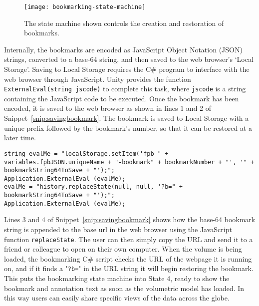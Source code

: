 \begin{figure}[htbp!]
\centering
\texttt{[image: bookmarking-state-machine]}
\caption[FPBioimage: Bookmark creation and restoration is controlled by a state machine]{The state machine shown controls the creation and restoration of bookmarks. }
\label{fig:bookmarking-state-machine}
\end{figure}

Internally, the bookmarks are encoded as JavaScript Object Notation (JSON) strings, converted to a base-64 string, and then saved to the web browser's `Local Storage'.
Saving to Local Storage requires the C\# program to interface with the web browser through JavaScript.
Unity provides the function \texttt{ExternalEval(string jscode)} to complete this task, where \texttt{jscode} is a string containing the JavaScript code to be executed.
Once the bookmark has been encoded, it is saved to the web browser as shown in lines 1 and 2 of Snippet~\ref{snip:savingbookmark}.
The bookmark is saved to Local Storage with a unique prefix followed by the bookmark's number, so that it can be restored at a later time.

\begin{lstfloat}
\begin{lstlisting}[language={[Sharp]c}, label={snip:savingbookmark}, caption={C\#-JavaScript interface code for interacting with the browser's local storage to save and share bookmarks}]
string evalMe = "localStorage.setItem('fpb-" + variables.fpbJSON.uniqueName + "-bookmark" + bookmarkNumber + "', '" + bookmarkString64ToSave + "');";
Application.ExternalEval (evalMe);
evalMe = "history.replaceState(null, null, '?b=" + bookmarkString64ToSave + "');";
Application.ExternalEval (evalMe);
\end{lstlisting}
\end{lstfloat}

Lines 3 and 4 of Snippet~\ref{snip:savingbookmark} shows how the base-64 bookmark string is appended to the base url in the web browser using the JavaScript function \texttt{replaceState}.
The user can then simply copy the URL and send it to a friend or colleague to open on their own computer.
When the volume is being loaded, the bookmarking C\# script checks the URL of the webpage it is running on, and if it finds a "\texttt{?b=}" in the URL string it will begin restoring the bookmark.
This puts the bookmarking state machine into State 4, ready to show the bookmark and annotation text as soon as the volumetric model has loaded.
In this way users can easily share specific views of the data across the globe.

